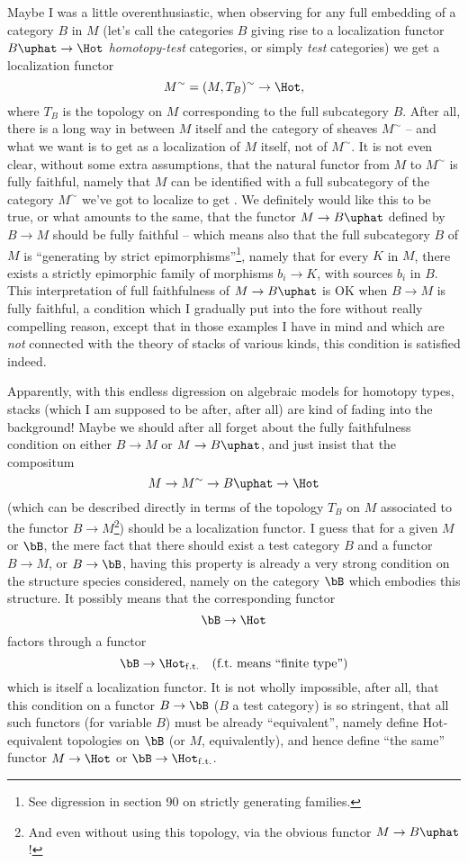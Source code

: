 Maybe I was a little overenthusiastic, when observing
for any full embedding of a category $B$ in $M$ (let's call the
categories $B$ giving rise to a localization functor $B\uphat\to
\Hot$ \emph{homotopy-test} categories, or simply \emph{test}
categories) we get a localization functor
\[ M^\sim = (M, T_B)^\sim \to \Hot,\]
where $T_B$ is the topology on $M$ corresponding to the full
subcategory $B$. After all, there is a long way in between $M$ itself
and the category of sheaves $M^\sim$ -- and what we want is to get
\Hot{} as a localization of $M$ itself, not of $M^\sim$. It is not even
clear, without some extra assumptions, that the natural functor from
$M$ to $M^\sim$ is fully faithful, namely that $M$ can be identified
with a full subcategory of the category $M^\sim$ we've got to localize
to get \Hot{}. We definitely would like this to be true, or what
amounts to the same, that the functor $M\to B\uphat$ defined by
$B\to M$ should be fully faithful -- which means also that the full
subcategory $B$ of $M$ is ``generating by strict epimorphisms''\footnote{See digression in section 90 on strictly generating families.}, namely
that for every $K$ in $M$, there exists a strictly epimorphic family
of morphisms $b_i \to K$, with sources $b_i$ in $B$. This
interpretation of full faithfulness of $M \to B\uphat$ is OK when
$B \to M$ is fully faithful, a condition which I gradually put into
the fore without really compelling reason, except that in those
examples I have in mind and which are \emph{not} connected with the
theory of stacks of various kinds, this condition is satisfied
indeed. 

Apparently, with this endless digression on algebraic models
for homotopy types, stacks (which I am supposed to be after, after
all) are kind of fading into the background! Maybe we should after all
forget about the fully faithfulness condition on either $B\to M$ or
$M\to B\uphat$, and just insist that the compositum
\[ M \to M^\sim \to B\uphat \to \Hot\]
(which can be described directly in terms of the topology $T_B$ on $M$
associated to the functor $B\to M$\footnote{And even without using this topology, via the obvious functor $M \to B\uphat$!}) should be a localization
functor. I guess that for a given $M$ or $\bB$, the mere fact that
there should exist a test category $B$ and a functor $B\to M$, or
$B\to\bB$, having this property is already a very strong condition on
the structure species considered, namely on the category $\bB$ which
embodies this structure. It possibly means that the corresponding
functor
\[ \bB \to \Hot\]
factors through a functor
\[ \bB \to \Hot_{\mathrm{f.t.}} \quad \text{(f.t.\ means ``finite
  type'')}\]
which is itself a localization functor. It is not wholly impossible,
after all, that this condition on a functor $B \to \bB$ ($B$ a test
category) is so stringent, that all such functors (for variable $B$)
must be already ``equivalent'', namely define
Hot-equivalent topologies on $\bB$ (or $M$, equivalently), and hence
define ``the same'' functor $M\to\Hot$ or
$\bB\to\Hot_{\mathrm{f.t.}}$.


